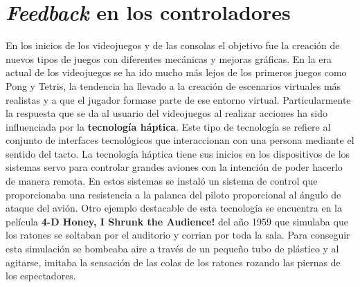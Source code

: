 \section{\textit{Feedback} en los controladores}

En los inicios de los videojuegos y de las consolas el objetivo fue la creaci\'on de nuevos tipos de juegos con diferentes mec\'anicas y mejoras gr\'aficas. En la era actual de los videojuegos se ha ido mucho m\'as lejos de los primeros juegos como Pong y Tetris, la tendencia ha llevado a la creaci\'on de escenarios virtuales m\'as realistas y a que el jugador formase parte de ese entorno virtual. Particularmente la respuesta que se da al usuario del videojuegos al realizar acciones ha sido influenciada por la \textbf{tecnolog\'ia h\'aptica}. Este tipo de tecnolog\'ia se refiere al conjunto de interfaces tecnol\'ogicos que interaccionan con una persona mediante el sentido del tacto. La tecnolog\'ia h\'aptica tiene sus inicios en los dispositivos de los sistemas servo para controlar grandes aviones con la intenci\'on de poder hacerlo de manera remota. En estos sistemas se instal\'o un sistema de control que proporcionaba una resistencia a la palanca del piloto proporcional al \'angulo de ataque del avi\'on. Otro ejemplo destacable de esta tecnolog\'ia se encuentra en la pel\'icula \textbf{4-D Honey, I Shrunk the Audience!} del a\~no 1959 que simulaba que los ratones se soltaban por el auditorio y corrian por toda la sala. Para conseguir esta simulaci\'on se bombeaba aire a trav\'es de un peque\~no tubo de pl\'astico y al agitarse, imitaba la sensaci\'on de las colas de los ratones rozando las piernas de los espectadores. \par

